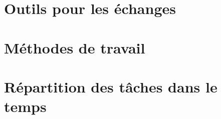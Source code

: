 \chapter{Outils pour les échanges}

\chapter{Méthodes de travail}

\chapter{Répartition des tâches dans le temps}
